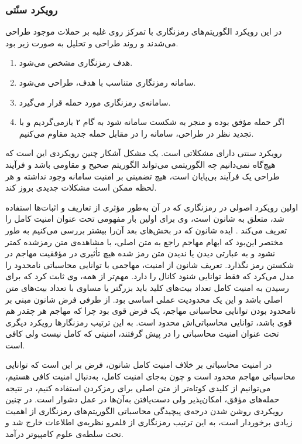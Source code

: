 \subsubsection*{رویکرد سنّتی}
در این رویکرد الگوریتم‌ها‌ی رمزنگاری با تمرکز روی غلبه بر حملات موجود طراحی می‌شدند و روند طراحی و تحلیل به صورت زیر بود.
\begin{enumerate}
\item
هدف رمزنگاری مشخص می‌شود.
\item
سامانه‌ رمزنگاری متناسب با هدف، طراحی می‌شود.
\item
سامانه‌ی رمزنگاری مورد حمله قرار می‌گیرد.
\item
 اگر حمله مؤفق بوده و منجر به شکست سامانه شود به گام ۲ بازمی‌گردیم و با تجدید نظر در طراحی، سامانه را در مقابل حمله جدید مقاوم می‌کنیم.
\end{enumerate}
رویکرد سنتی دارای مشکلاتی است. یک مشکل آشکار چنین رویکردی این است که هیچ‌گاه نمی‌دانیم چه الگوریتمی می‌تواند الگوریتم صحیح و مقاومی باشد و فرآیند طراحی یک فرآیند بی‌پایان است، هیچ تضمینی بر امنیت سامانه وجود نداشته و هر لحظه ممکن است مشکلات جدیدی بروز کند.


اولین رویکرد اصولی در رمزنگاری که در آن به‌طور مؤثری از تعاریف و اثبات‌ها استفاده شد، متعلق به شانون است، وی برای اولین بار مفهومی تحت عنوان امنیت کامل را تعریف  می‌کند
\cite{shannon1949communication}
. ایده‌  شانون که در بخش‌های بعد آن‌را بیشتر بررسی می‌کنیم به طور مختصر این‌بود که ابهام مهاجم راجع به متن اصلی، با مشاهده‌ی متن رمزشده کمتر نشود و به عبارتی دیدن یا ندیدن متن رمز شده هیچ تأثیری در  مؤفقیت مهاجم در شکستن رمز نگذارد. تعریف  شانون از امنیت، مهاجمی با توانایی محاسباتی نامحدود را مدل می‌کرد که فقط توانایی شنود کانال را دارد. مهم‌تر از همه، وی ثابت کرد که برای رسیدن به امنیت کامل تعداد بیت‌های کلید باید بزرگتر یا مساوی با تعداد بیت‌های متن اصلی باشد و این یک محدودیت عملی اساسی بود. از طرفی فرض شانون مبنی بر نامحدود بودن توانایی محاسباتی مهاجم، یک فرض قوی بود چرا که مهاجم هر چقدر هم قوی باشد، توانایی محاسباتی‌اش محدود است. به این ترتیب رمزنگارها رویکرد دیگری تحت عنوان امنیت محاسباتی را در پیش گرفتند، امنیتی که کامل نیست ولی کافی است.


در امنیت محاسباتی بر خلاف امنیت کامل شانون، فرض بر این است که توانایی محاسباتی مهاجم محدود است و چون به‌جای امنیت کامل، به‌دنبال امنیت کافی هستیم، می‌توانیم از کلیدی کوتاه‌تر از متن اصلی برای رمزکردن استفاده کنیم، در نتیجه حمله‌های مؤفق، امکان‌پذیر ولی دست‌یافتن به‌آن‌ها در عمل دشوار است. در چنین رویکردی  روشن شدن درجه‌ی پیچیدگی محاسباتی الگوریتم‌های رمزنگاری از اهمیت زیادی برخوردار است، به این ترتیب رمزنگاری از قلمرو نظریه‌ی اطلاعات خارج شد و تحت سلطه‌ی علوم کامپیوتر درآمد.
